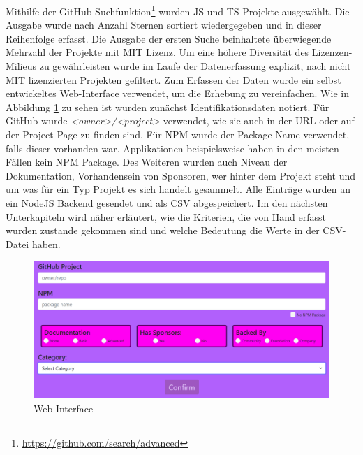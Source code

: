 Mithilfe der GitHub Suchfunktion\footnote{\url{https://github.com/search/advanced}} wurden JS und 
TS Projekte ausgewählt. Die Ausgabe wurde nach Anzahl Sternen sortiert wiedergegeben und in 
dieser Reihenfolge erfasst.
Die Ausgabe der ersten Suche beinhaltete überwiegende Mehrzahl der Projekte mit MIT Lizenz. Um eine
höhere Diversität des Lizenzen-Milieus zu gewährleisten wurde im Laufe der Datenerfassung explizit,
nach nicht MIT lizenzierten Projekten gefiltert.
Zum Erfassen der Daten wurde ein selbst entwickeltes Web-Interface verwendet, um die Erhebung
zu vereinfachen. Wie in Abbildung \ref{abb:Web_Interface} zu sehen ist wurden zunächst
Identifikationsdaten notiert. Für GitHub wurde \textit{<owner>/<project>} verwendet,
wie sie auch in der URL oder auf der Project Page zu finden sind. Für NPM wurde der Package Name
verwendet, falls dieser vorhanden war. Applikationen beispielsweise haben in den meisten
Fällen kein NPM Package.
Des Weiteren wurden auch Niveau der Dokumentation, Vorhandensein von Sponsoren, wer hinter dem 
Projekt steht und um was für ein Typ Projekt es sich handelt gesammelt.
Alle Einträge wurden an ein NodeJS Backend gesendet und als CSV abgespeichert.
Im den nächsten Unterkapiteln wird näher erläutert, wie die Kriterien, die von Hand erfasst wurden 
zustande gekommen sind und welche Bedeutung die Werte in der CSV-Datei haben.


\begin{figure}[]
    \centering
    \includegraphics[scale=0.25]{figures/04/WebInterface.png}
    \caption{Web-Interface}
    \label{abb:Web_Interface}
\end{figure}




